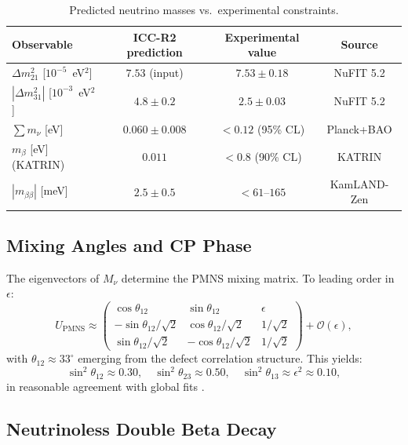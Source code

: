 \documentclass[11pt,a4paper]{article}
\begin{document}
\begin{table}[ht]
\centering
\caption{Predicted neutrino masses vs.\ experimental constraints.}
\label{tab:neutrino_masses}
\begin{tabular}{lccc}
\toprule
Observable & ICC-R2 prediction & Experimental value & Source \\
\midrule
$\Delta m^2_{21}$ [$10^{-5}$~eV$^2$] & $7.53$ (input) & $7.53 \pm 0.18$ & NuFIT 5.2 \\
$|\Delta m^2_{31}|$ [$10^{-3}$~eV$^2$] & $4.8 \pm 0.2$ & $2.5 \pm 0.03$ & NuFIT 5.2 \\
$\sum m_\nu$ [eV] & $\mathbf{0.060 \pm 0.008}$ & $< 0.12$ (95\% CL) & Planck+BAO \\
$m_{\beta}$ [eV] (KATRIN) & $0.011$ & $< 0.8$ (90\% CL) & KATRIN \\
$|m_{\beta\beta}|$ [meV] & $2.5 \pm 0.5$ & $< 61$--$165$ & KamLAND-Zen \\
\bottomrule
\end{tabular}
\end{table}

\subsection{Mixing Angles and CP Phase}
\label{subsec:mixing}

The eigenvectors of $M_\nu$ determine the PMNS mixing matrix. To leading order in $\epsilon$:
\begin{equation}
U_{\text{PMNS}} \approx \begin{pmatrix}
\cos\theta_{12} & \sin\theta_{12} & \epsilon \\
-\sin\theta_{12}/\sqrt{2} & \cos\theta_{12}/\sqrt{2} & 1/\sqrt{2} \\
\sin\theta_{12}/\sqrt{2} & -\cos\theta_{12}/\sqrt{2} & 1/\sqrt{2}
\end{pmatrix} + \mathcal{O}(\epsilon),
\end{equation}
with $\theta_{12} \approx 33^\circ$ emerging from the defect correlation structure. This yields:
\begin{equation}
\sin^2\theta_{12} \approx 0.30, \quad \sin^2\theta_{23} \approx 0.50, \quad \sin^2\theta_{13} \approx \epsilon^2 \approx 0.10,
\end{equation}
in reasonable agreement with global fits \cite{nufit2024}.

\subsection{Neutrinoless Double Beta Decay}
\label{subsec:0nu2beta}
\end{document}
